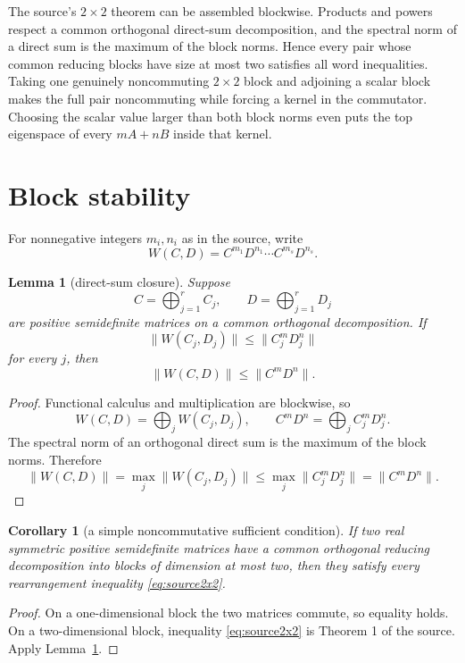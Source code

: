 \documentclass[11pt]{article}
\newtheorem{lemma}{Lemma}
\newtheorem{corollary}{Corollary}
\begin{document}
The source's $2\times2$ theorem can be assembled blockwise.  Products and
powers respect a common orthogonal direct-sum decomposition, and the spectral
norm of a direct sum is the maximum of the block norms.  Hence every pair
whose common reducing blocks have size at most two satisfies all word
inequalities.  Taking one genuinely noncommuting $2\times2$ block and adjoining
a scalar block makes the full pair noncommuting while forcing a kernel in the
commutator.  Choosing the scalar value larger than both block norms even puts
the top eigenspace of every $mA+nB$ inside that kernel.

\section{Block stability}

For nonnegative integers $m_i,n_i$ as in the source, write
\[
 W(C,D)=C^{m_1}D^{n_1}\cdots C^{m_s}D^{n_s}.
\]

\begin{lemma}[direct-sum closure]\label{lem:sum}
Suppose
\[
 C=\bigoplus_{j=1}^r C_j,\qquad D=\bigoplus_{j=1}^r D_j
\]
are positive semidefinite matrices on a common orthogonal decomposition.  If
\[
 \|W(C_j,D_j)\|\le \|C_j^mD_j^n\|
\]
for every $j$, then
\[
 \|W(C,D)\|\le \|C^mD^n\|.
\]
\end{lemma}

\begin{proof}
Functional calculus and multiplication are blockwise, so
\[
 W(C,D)=\bigoplus_j W(C_j,D_j),\qquad
 C^mD^n=\bigoplus_j C_j^mD_j^n.
\]
The spectral norm of an orthogonal direct sum is the maximum of the block
norms.  Therefore
\[
 \|W(C,D)\|=\max_j\|W(C_j,D_j)\|
 \le \max_j\|C_j^mD_j^n\|=\|C^mD^n\|.
\]
\end{proof}

\begin{corollary}[a simple noncommutative sufficient condition]\label{cor:block}
If two real symmetric positive semidefinite matrices have a common
orthogonal reducing decomposition into blocks of dimension at most two, then
they satisfy every rearrangement inequality \eqref{eq:source2x2}.
\end{corollary}

\begin{proof}
On a one-dimensional block the two matrices commute, so equality holds.  On
a two-dimensional block, inequality \eqref{eq:source2x2} is Theorem 1 of the
source.  Apply Lemma~\ref{lem:sum}.
\end{proof}
\end{document}

